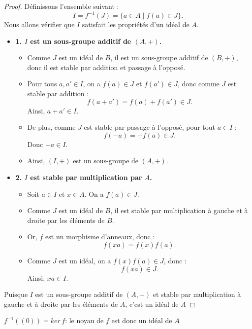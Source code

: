 \begin{proof}
    Définissons l’ensemble suivant :
\[
I = f^{-1}(J) = \{ a \in A \mid f(a) \in J \}.
\]
Nous allons vérifier que $I$ satisfait les propriétés d’un idéal de $A$.  

\begin{itemize}
    \item \textbf{1. $I$ est un sous-groupe additif de $(A, +)$.}  
    \begin{itemize}
        \item Comme $J$ est un idéal de $B$, il est un sous-groupe additif de $(B, +)$, donc il est stable par addition et passage à l’opposé.
        \item Pour tous $a, a' \in I$, on a $f(a) \in J$ et $f(a') \in J$, donc comme $J$ est stable par addition :
        \[
        f(a + a') = f(a) + f(a') \in J.
        \]
        Ainsi, $a + a' \in I$.
        \item De plus, comme $J$ est stable par passage à l’opposé, pour tout $a \in I$ :
        \[
        f(-a) = -f(a) \in J.
        \]
        Donc $-a \in I$.
        \item Ainsi, $(I, +)$ est un sous-groupe de $(A, +)$.
    \end{itemize}

    \item \textbf{2. $I$ est stable par multiplication par $A$.}  
    \begin{itemize}
        \item Soit $a \in I$ et $x \in A$. On a $f(a) \in J$.
        \item Comme $J$ est un idéal de $B$, il est stable par multiplication à gauche et à droite par les éléments de $B$.  
        \item Or, $f$ est un morphisme d’anneaux, donc :
        \[
        f(xa) = f(x) f(a).
        \]
        \item Comme $J$ est un idéal, on a $f(x) f(a) \in J$, donc :
        \[
        f(xa) \in J.
        \]
        Ainsi, $xa \in I$.
    \end{itemize}
\end{itemize}

Puisque $I$ est un sous-groupe additif de $(A, +)$ et stable par multiplication à gauche et à droite par les éléments de $A$, c’est un idéal de $A$
\end{proof}

\begin{remarque}
    $f^{-1}((0))=ker\,f$: le noyau de $f$ est donc un idéal de $A$
\end{remarque}

